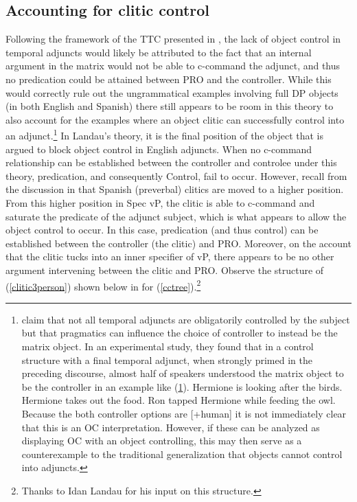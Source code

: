 \documentclass[output=paper,colorlinks,citecolor=brown]{langscibook}
\begin{document}
\subsection{Accounting for clitic control} \label{section4.1}
Following the framework of the TTC presented in \citet{landau2015}, the lack of object control in temporal adjuncts would likely be attributed to the fact that an internal argument in the matrix would not be able to c-command the adjunct, and thus no predication could be attained between PRO and the controller. While this would correctly rule out the ungrammatical examples involving full DP objects (in both English and Spanish) there still appears to be room in this theory to also account for the examples where an object clitic can successfully control into an adjunct.\footnote{\citet{janke2017} claim that not all temporal adjuncts are obligatorily controlled by the subject but that pragmatics can influence the choice of controller to instead be the matrix object. In an experimental study, they found that in a control structure with a final temporal adjunct, when strongly primed in the preceding discourse, almost half of speakers understood the matrix object to be the controller in an example like (\ref{HPcontrol}).
\ea \label{HPcontrol} Hermione is looking after the birds. Hermione takes out the food. Ron tapped Hermione while feeding the owl.
\z
Because the both controller options are [+human] it is not immediately clear that this is an OC interpretation. However, if these can be analyzed as displaying OC with an object controlling, this may then serve as a counterexample to the traditional generalization that objects cannot control into adjuncts.} In Landau’s theory, it is the final position of the object that is argued to block object control in English adjuncts. When no c-command relationship can be established between the controller and controlee under this theory, predication, and consequently Control, fail to occur. However, recall from the discussion in  that Spanish (preverbal) clitics are moved to a higher position. From this higher position in Spec vP, the clitic is able to c-command and saturate the predicate of the adjunct subject, which is what appears to allow the object control to occur. In this case, predication (and thus control) can be established between the controller (the clitic) and PRO. Moreover, on the account that the clitic tucks into an inner specifier of vP, there appears to be no other argument intervening between the clitic and PRO. Observe the structure of (\ref{clitic3person}) shown below in  for (\ref{cctree}).\footnote{Thanks to Idan Landau for his input on this structure.}
\end{document}
